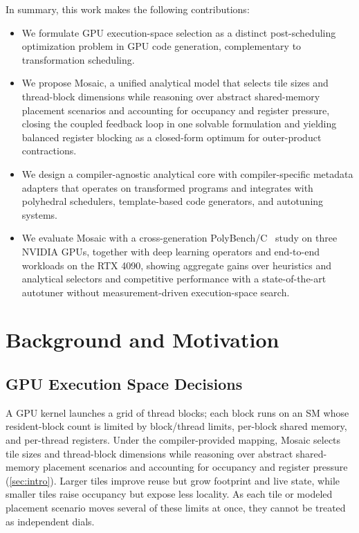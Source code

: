 \documentclass[acmsmall,review,anonymous,screen]{acmart}
\newcommand{\name}{{Mosaic}\xspace}
\newcommand{\gpu}{GPU\xspace}
\newcommand{\gpus}{GPUs\xspace}
\begin{document}
In summary, this work makes the following contributions:
\begin{itemize}
  \item We formulate \gpu execution-space selection as a distinct post-scheduling optimization problem in GPU code generation, complementary to transformation scheduling.
  \item We propose \name, a unified analytical model that selects tile sizes and thread-block dimensions while reasoning over abstract shared-memory placement scenarios and accounting for occupancy and register pressure, closing the coupled feedback loop in one solvable formulation and yielding balanced register blocking as a closed-form optimum for outer-product contractions.
  \item We design a compiler-agnostic analytical core with compiler-specific metadata adapters that operates on transformed programs and integrates with polyhedral schedulers, template-based code generators, and autotuning systems.
  \item We evaluate \name with a cross-generation PolyBench/C~\cite{polybench} study on three NVIDIA \gpus, together with deep learning operators and end-to-end workloads on the RTX 4090, showing aggregate gains over heuristics and analytical selectors and competitive performance with a state-of-the-art autotuner without measurement-driven execution-space search.
\end{itemize}

\section{Background and Motivation}
\label{sec:background}

\subsection{GPU Execution Space Decisions}
\label{sec:bg-decisions}
\label{sec:gpu-execution-model}

A GPU kernel launches a grid of thread blocks; each block runs on an SM whose resident-block count is limited by block/thread limits, per-block shared memory, and per-thread registers. Under the compiler-provided mapping, \name selects tile sizes and thread-block dimensions while reasoning over abstract shared-memory placement scenarios and accounting for occupancy and register pressure (\autoref{sec:intro}). Larger tiles improve reuse but grow footprint and live state, while smaller tiles raise occupancy but expose less locality. As each tile or modeled placement scenario moves several of these limits at once, they cannot be treated as independent dials.
\end{document}
